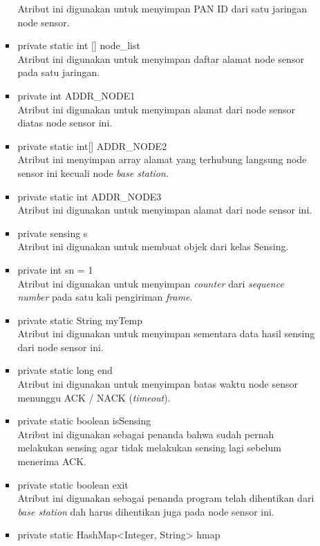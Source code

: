 \begin{itemize}
\begin{itemize}
\begin{itemize}
            Atribut ini digunakan untuk menyimpan PAN ID dari satu jaringan node sensor.
            \item private static int [] node\_list\\
            Atribut ini digunakan untuk menyimpan daftar alamat node sensor pada satu jaringan.
            \item private int ADDR\_NODE1\\
            Atribut ini digunakan untuk menyimpan alamat dari node sensor diatas node sensor ini.
            \item private static int[] ADDR\_NODE2\\
            Atribut ini menyimpan array alamat yang terhubung langsung node sensor ini kecuali node \textit{base station}.
            \item private static int ADDR\_NODE3\\
            Atribut ini digunakan untuk menyimpan alamat dari node sensor ini.
            \item private sensing s\\
            Atribut ini digunakan untuk membuat objek dari kelas Sensing.
            \item private int sn = 1\\
            Atribut ini digunakan untuk menyimpan \textit{counter} dari \textit{sequence number} pada satu kali pengiriman \textit{frame}.
            \item private static String myTemp\\
            Atribut ini digunakan untuk menyimpan sementara data hasil sensing dari node sensor ini.
            \item private static long end\\
            Atribut ini digunakan untuk menyimpan batas waktu node sensor menunggu ACK / NACK (\textit{timeout}).
            \item private static boolean isSensing\\
            Atribut ini digunakan sebagai penanda bahwa sudah pernah melakukan sensing agar tidak melakukan sensing lagi sebelum menerima ACK.
            \item private static boolean exit\\
            Atribut ini digunakan sebagai penanda program telah dihentikan dari \textit{base station} dah harus dihentikan juga pada node sensor ini.
            \item private static HashMap<Integer, String> hmap\\

\end{itemize}
\end{itemize}
\end{itemize}
